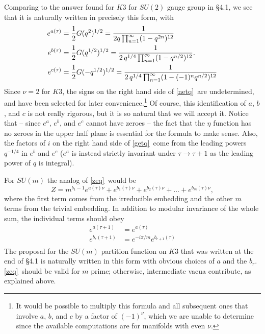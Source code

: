 \documentclass[12pt]{article}
\numberwithin{equation}{section}
\begin{document}
Comparing to the answer found for $K3$ for $SU(2)$ gauge group
in \S4.1, we see that it is naturally written in precisely this form,
with
\begin{equation}
  \label{netq}
  \begin{aligned}
    e^{a(\tau)}&={1\over 2}G(q^2)^{1/2}= {1\over 2q\prod_{n=1}^\infty
    (1-q^{2n})^{12}} \\
    e^{b(\tau)} &= {1\over 2}G(q^{1/2})^{1/2}= {1\over
    2\,q^{1/4}\prod_{n=1}^\infty (1-q^{n/2})^{12}}.\\
    e^{c(\tau)} &= {1\over 2}G(-q^{1/2})^{1/2}= {1\over 2\,q^{1/4}
    \prod_{n=1}^\infty (1-(-1)^nq^{n/2})^{12}} \\
  \end{aligned}
\end{equation}
Since $\nu=2$ for $K3$, the signs on the right hand side of \eqref{netq}\ are
undetermined, and have been selected for later
convenience.\footnote{It would be possible to multiply this formula
  and all subsequent ones that involve $a$, $b$, and $c$ by a factor of
  $(-1)^\nu$, which we are unable to determine since the available
computations are for manifolds with even $\nu$.}
Of course, this identification of $a$, $b$, and $c$ is
not really rigorous, but it is so natural that we will accept it.
Notice that -- since $e^a$, $e^b$, and $e^c$ cannot have zeroes --
the fact that
the $\eta$ function has no zeroes in the upper half plane is essential
for the formula to make sense.  Also, the factors of $i$ on the right
hand side of \eqref{getq}\ come from the leading powers $q^{-1/4}$ in $e^b$
and $e^c$ ($e^a$ is instead strictly invariant under $\tau\to\tau+1$
as the leading power of $q$ is integral).

For $SU(m)$ the analog of \eqref{zeq}\ would be
\begin{equation}
  Z = m^{b_1-1}e^{a(\tau)\nu}+e^{b_1(\tau)\nu}+e^{b_2(\tau)\nu}+\dots
  +e^{b_m(\tau)\nu},
\end{equation}
where the first term comes from the irreducible embedding and
the other $m$ terms from the trivial embedding.  In addition to
modular invariance of the whole sum, the individual terms should obey
\begin{equation}
  \label{zzeq}
  \begin{aligned}e^{a(\tau+1)} & =e^{a(\tau)}\\ e^{b_r(\tau+1)} & =
    e^{-i\pi/m}e^{b_{r+1}(\tau)}\\
  \end{aligned}
\end{equation}
The proposal for the $SU(m)$ partition function on $K3$ that was written
at the end of \S4.1 is naturally written in this form with obvious
choices of $a$ and the $b_r$.  \eqref{zeq}\ should be valid
for $m$ prime; otherwise, intermediate vacua contribute, as explained
above.
\end{document}
